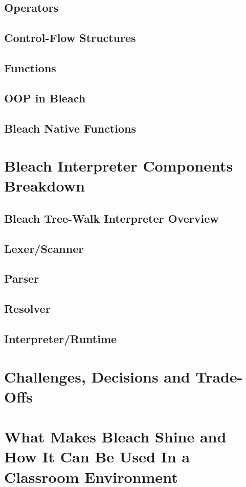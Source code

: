 \subsection{Operators}
\subsection{Control-Flow Structures}
\subsection{Functions}
\subsection{OOP in Bleach}
\subsection{Bleach Native Functions}

\section{Bleach Interpreter Components Breakdown}

\subsection{Bleach Tree-Walk Interpreter Overview}
\subsection{Lexer/Scanner}
\subsection{Parser}
\subsection{Resolver}
\subsection{Interpreter/Runtime}

\section{Challenges, Decisions and Trade-Offs}

\section{What Makes Bleach Shine and How It Can Be Used In a Classroom Environment}
